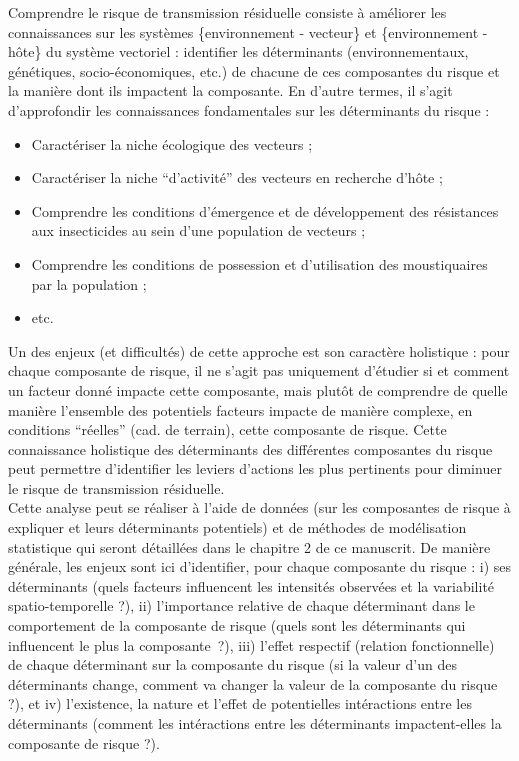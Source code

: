 \documentclass[12pt,twoside]{reedthesis}
\providecommand{\tightlist}{%
  \setlength{\itemsep}{0pt}\setlength{\parskip}{0pt}}
\begin{document}
Comprendre le risque de transmission résiduelle consiste à améliorer les connaissances sur les systèmes \{environnement - vecteur\} et \{environnement - hôte\} du système vectoriel : identifier les déterminants (environnementaux, génétiques, socio-économiques, etc.) de chacune de ces composantes du risque et la manière dont ils impactent la composante. En d'autre termes, il s'agit d'approfondir les connaissances fondamentales sur les déterminants du risque :
\begin{itemize}
\tightlist
\item
  Caractériser la niche écologique des vecteurs ;
\item
  Caractériser la niche ``d'activité'' des vecteurs en recherche d'hôte ;
\item
  Comprendre les conditions d'émergence et de développement des résistances aux insecticides au sein d'une population de vecteurs ;
\item
  Comprendre les conditions de possession et d'utilisation des moustiquaires par la population ;
\item
  etc.\\
\end{itemize}
Un des enjeux (et difficultés) de cette approche est son caractère holistique : pour chaque composante de risque, il ne s'agit pas uniquement d'étudier si et comment un facteur donné impacte cette composante, mais plutôt de comprendre de quelle manière l'ensemble des potentiels facteurs impacte de manière complexe, en conditions ``réelles'' (cad. de terrain), cette composante de risque. Cette connaissance holistique des déterminants des différentes composantes du risque peut permettre d'identifier les leviers d'actions les plus pertinents pour diminuer le risque de transmission résiduelle.\\

Cette analyse peut se réaliser à l'aide de données (sur les composantes de risque à expliquer et leurs déterminants potentiels) et de méthodes de modélisation statistique qui seront détaillées dans le chapitre 2 de ce manuscrit. De manière générale, les enjeux sont ici d'identifier, pour chaque composante du risque : i) ses déterminants (quels facteurs influencent les intensités observées et la variabilité spatio-temporelle ?), ii) l'importance relative de chaque déterminant dans le comportement de la composante de risque (quels sont les déterminants qui influencent le plus la composante~?), iii) l'effet respectif (relation fonctionnelle) de chaque déterminant sur la composante du risque (si la valeur d'un des déterminants change, comment va changer la valeur de la composante du risque ?), et iv) l'existence, la nature et l'effet de potentielles intéractions entre les déterminants (comment les intéractions entre les déterminants impactent-elles la composante de risque ?).
\end{document}
